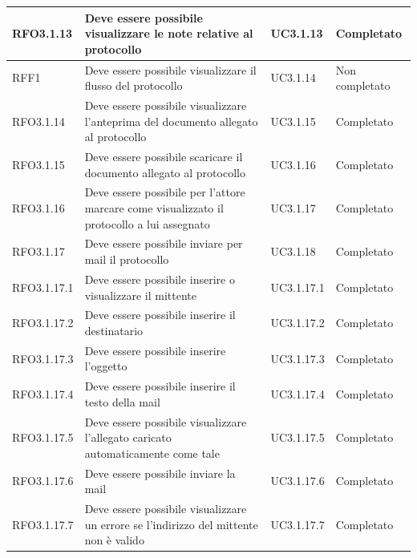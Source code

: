 \begin{longtable}{| p{3cm} | p{6cm} | p{3cm} | p{3cm} |}
        RFO3.1.13 & Deve essere possibile visualizzare le note relative al protocollo & UC3.1.13 & Completato
        \\ \hline
        
        RFF1 & Deve essere possibile visualizzare il flusso del protocollo & UC3.1.14 &  Non completato
        \\ \hline
        
        RFO3.1.14 & Deve essere possibile visualizzare l'anteprima del documento allegato al protocollo & UC3.1.15 & Completato
        \\ \hline
        
        RFO3.1.15 & Deve essere possibile scaricare il documento allegato al protocollo & UC3.1.16 & Completato
        \\ \hline
        
        RFO3.1.16 & Deve essere possibile per l'attore marcare come visualizzato il protocollo a lui assegnato & UC3.1.17 & Completato
        \\ \hline
        
        RFO3.1.17 & Deve essere possibile inviare per mail il protocollo & UC3.1.18 & Completato
        \\ \hline
        
        RFO3.1.17.1 & Deve essere possibile inserire o visualizzare il mittente & UC3.1.17.1 & Completato
        \\ \hline
        
        RFO3.1.17.2 & Deve essere possibile inserire il destinatario & UC3.1.17.2 & Completato
        \\ \hline
        
        RFO3.1.17.3 & Deve essere possibile inserire l'oggetto & UC3.1.17.3 & Completato
        \\ \hline
        
        RFO3.1.17.4 & Deve essere possibile inserire il testo della mail & UC3.1.17.4 & Completato
        \\ \hline
        
        RFO3.1.17.5 & Deve essere possibile visualizzare l'allegato caricato automaticamente come tale & UC3.1.17.5 & Completato
        \\ \hline
        
        RFO3.1.17.6 & Deve essere possibile inviare la mail& UC3.1.17.6 & Completato
        \\ \hline
        
        RFO3.1.17.7 & Deve essere possibile visualizzare un errore se l'indirizzo del mittente non è valido & UC3.1.17.7 & Completato
        \\ \hline
        

\end{longtable}
